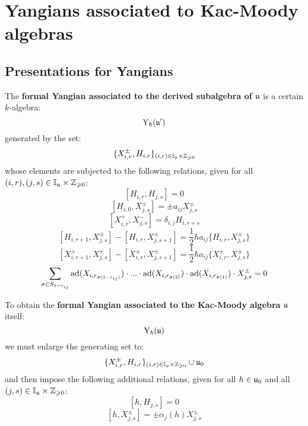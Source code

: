 \section{Yangians associated to Kac-Moody algebras} \label{section: yangians_of_kac_moody_algebras}
    \subsection{Presentations for Yangians}
        \begin{definition} \label{def: formal_yangians_associated_to_symmetrisable_kac_moody_algebras}
            The \textbf{formal Yangian associated to the derived subalgebra of $\mathfrak{u}$} is a certain $k$-algebra:
                $$\mathrm{Y}_{\hbar}(\mathfrak{u}')$$
            generated by the set:
                $$\{X_{i, r}^{\pm}, H_{i, r}\}_{(i, r) \in \simpleroots_{\fraku} \x \Z_{\geq 0}}$$
            whose elements are subjected to the following relations, given for all $(i, r), (j, s) \in \simpleroots_{\fraku} \x \Z_{\geq 0}$:
                $$[H_{i, r}, H_{j, s}] = 0$$
                $$[H_{i, 0}, X_{j, s}^{\pm}] = \pm a_{ij} X_{j, s}^{\pm}$$
                $$[X_{i, r}^+, X_{j, s}^-] = \delta_{i, j} H_{i, r + s}$$
                $$[H_{i, r + 1}, X^{\pm}_{j, s}] - [H_{i, r}, X^{\pm}_{j, s + 1}] = \frac12 \hbar a_{ij} \{H_{i, r}, X^{\pm}_{j, s}\}$$
                $$[X^{\pm}_{i, r + 1}, X^{\pm}_{j, s}] - [X^{\pm}_{i, r}, X^{\pm}_{j, s + 1}] = \frac12 \hbar a_{ij} \{X^{\pm}_{i, r}, X^{\pm}_{j, s}\}$$
                $$\sum_{ \sigma \in S_{1 - c_{ij}} } \mathrm{ad}(X_{ i, r_{\sigma(1 - c_{ij})} }) \cdot ... \cdot \mathrm{ad}(X_{ i, r_{\sigma(2)} }) \cdot \mathrm{ad}(X_{ i, r_{\sigma(1)} }) \cdot X_{j, s}^{\pm} = 0$$
                
            To obtain the \textbf{formal Yangian associated to the Kac-Moody algebra $\mathfrak{u}$} itself:
                $$\mathrm{Y}_{\hbar}(\mathfrak{u})$$
            we must enlarge the generating set to:
                $$\{X_{i, r}^{\pm}, H_{i, r}\}_{(i, r) \in \simpleroots_{\fraku} \x \Z_{\geq 0}} \cup \fraku_0$$
            and then impose the following additional relations, given for all $h \in \mathfrak{u}_0$ and all $(j, s) \in \simpleroots_{\fraku} \x \Z_{\geq 0}$:
                $$[h, H_{j, s}] = 0$$
                $$[h, X_{j, s}^{\pm}] = \pm \alpha_j(h) X_{j, s}^{\pm}$$
        \end{definition}

